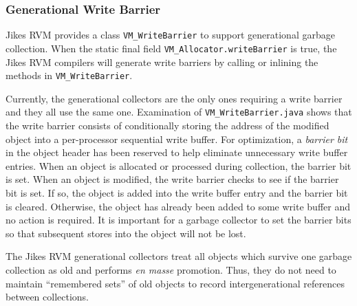 \subsubsection{Generational Write Barrier}
Jikes RVM provides a class {\tt VM\_WriteBarrier} to support generational garbage collection.
When the static final field {\tt VM\_Allocator.writeBarrier} is true,
the Jikes RVM compilers will generate write barriers by calling or inlining the methods in
{\tt VM\_WriteBarrier}.

Currently, the generational collectors are the only ones requiring a write barrier
and they all use the same one.  Examination of {\tt VM\_WriteBarrier.java} shows
that the write barrier consists of conditionally storing the address of the modified object
into a per-processor sequential write buffer.  For optimization, a {\it barrier bit} in the object header
has been reserved to help eliminate unnecessary write buffer entries.
When an object is allocated or processed during collection, the barrier bit is set.
When an object is modified, the write barrier checks to see if the barrier bit is set.
If so, the object is added into the write buffer entry and the barrier bit is cleared.
Otherwise, the object has already been added to some write buffer and no action is required.
It is important for a garbage collector to set the barrier bits so that
subsequent stores into the object will not be lost.

The Jikes RVM generational collectors treat all objects which survive one garbage collection as old
and performs {\it en masse} promotion.  Thus, they do not need to maintain ``remembered sets''
of old objects to record intergenerational references between collections.

